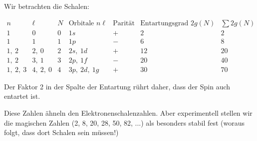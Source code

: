 \documentclass[Ex4_Zusammenfassung.tex]{subfiles}
\begin{document}
Wir betrachten die Schalen:
\begin{table}
	\centering
	$
	\begin{array}{llclccc}
	n & \ell & N & \text{Orbitale } n\ell & \text{Parität} & \text{Entartungsgrad } 2g(N) & \sum 2g(N) \\ \hline
	1 & 0 & 0 & 1s & + & 2 & 2 \\ 
	1 & 1 & 1 & 1p & - & 6 & 8 \\ 
	1,\ 2 & 2,\ 0 & 2 & 2s,\ 1d & + & 12 & 20 \\ 
	1,\ 2 & 3,\ 1 & 3 & 2p,\ 1f & - & 20 & 40 \\ 
	1,\ 2,\ 3 & 4,\ 2,\ 0 & 4 & 3p,\ 2d,\ 1g & + & 30 & 70
	\end{array} 
	$
	\caption{Der Faktor 2 in der Spalte der Entartung rührt daher, dass der Spin auch entartet ist. }
\end{table}
Diese Zahlen ähneln den Elektronenschalenzahlen. Aber experimentell stellen wir die magischen Zahlen (2, 8, 20, 28, 50, 82, ...) als besonders stabil fest (woraus folgt, dass dort Schalen sein müssen!) 
\end{document}
